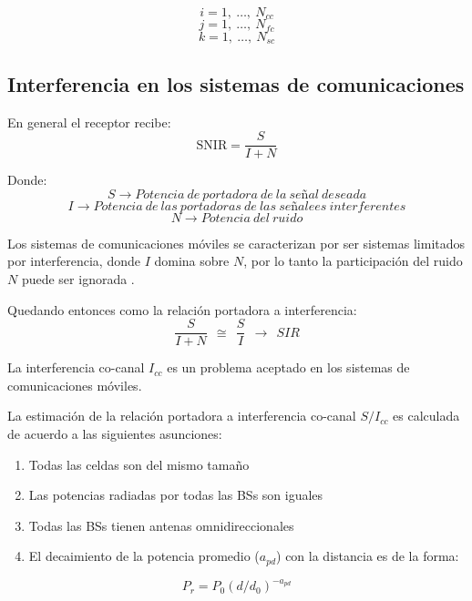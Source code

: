 \[i=1,\ \dots ,\ N_{cc}\] 
\[j=1,\ \dots ,\ N_{fc}\] 
\[k=1,\ \dots ,\ N_{sc}\] 



\subsection{Interferencia en los sistemas de comunicaciones}

En general el receptor recibe:\newline
\begin{equation}
\mathrm{SNIR=}\frac{S}{I+N}
\label{eqn:SNIR}
\end{equation}

Donde:
\[S\to Potencia\ de\ portadora\ de\ la\ se\textrm{\~{n}}al\ deseada\] 
\[I\to Potencia\ de\ las\ portadoras\ de\ las\ se\textrm{\~{n}}alees\ interferentes\] 
\[N\to Potencia\ del\ ruido\] 

Los sistemas de comunicaciones móviles se caracterizan por ser sistemas limitados por interferencia, donde $I$ domina sobre $N$, por lo tanto la participación del ruido $N$ puede ser ignorada \parencite{Correia2018}.\newline

Quedando entonces como la relación portadora a interferencia:\newline
\begin{equation}
\frac{S}{I+N}\ \ \cong \ \ \frac{S}{I}\ \ \to \ \ SIR
\label{eqn:SIR}
\end{equation}

La interferencia co-canal $I_{cc}$ es un problema aceptado en los sistemas de comunicaciones móviles. \newline

La estimación de la relación portadora a interferencia co-canal ${S}/{I_{cc}}$ es calculada de acuerdo  a las siguientes asunciones:

\begin{enumerate}
\item  Todas las celdas son del mismo tamaño
\item  Las potencias radiadas por todas las BSs son iguales
\item  Todas las BSs tienen antenas omnidireccionales
\item  El decaimiento de la potencia promedio ($a_{pd}$) con la distancia es de la forma:
\end{enumerate}
\begin{equation}
P_r=P_0{(d/d_0)}^{-a_{pd}} 
\label{eqn:P_r}
\end{equation}

